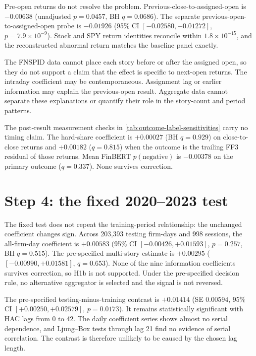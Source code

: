 Pre-open returns do not resolve the problem. Previous-close-to-assigned-open is
$-0.00638$ (unadjusted $p=0.0457$, BH $q=0.0686$). The separate
previous-open-to-assigned-open probe is $-0.01926$ (95\% CI
$[-0.02580,-0.01272]$, $p=7.9\times10^{-9}$). Stock and SPY return identities
reconcile within $1.8\times10^{-15}$, and the reconstructed abnormal return
matches the baseline panel exactly.



The FNSPID data cannot place each story before or after the assigned open, so
they do not support a claim that the effect is specific to next-open
returns. The intraday coefficient
may be contemporaneous. Assignment lag or earlier information may explain the
previous-open result. Aggregate data cannot separate these explanations or
quantify their role in the story-count and period patterns.

The post-result measurement checks in
\cref{tab:outcome-label-sensitivities} carry no timing claim. The hard-share
coefficient is $+0.00027$ (BH $q=0.929$) on close-to-close returns and $+0.00182$
($q=0.815$) when the outcome is the trailing FF3 residual of those returns. Mean
FinBERT $p(\mathrm{negative})$ is $-0.00378$ on the primary outcome ($q=0.337$).
None survives correction.



\section{Step 4: the fixed 2020--2023 test}
\label{sec:temporal-replication}

The fixed test does not repeat the training-period relationship: the unchanged
coefficient changes sign. Across 203,393 testing firm-days and 998 sessions, the
all-firm-day coefficient is $+0.00583$ (95\% CI
$[-0.00426,+0.01593]$, $p=0.257$, BH $q=0.515$). The pre-specified multi-story
estimate is $+0.00295$ ($[-0.00990,+0.01581]$, $q=0.653$). None of the nine
information coefficients survives correction, so H1b is not supported. Under
the pre-specified decision rule, no alternative aggregator is selected and the
signal is not reversed.

The pre-specified testing-minus-training contrast is $+0.01414$ (SE $0.00594$,
95\% CI $[+0.00250,+0.02579]$, $p=0.0173$). It remains statistically significant
with HAC lags from 0 to 42. The daily coefficient series shows almost no serial
dependence, and Ljung--Box tests through lag 21 find no evidence of serial
correlation. The contrast is therefore unlikely to be caused by the chosen lag
length.

